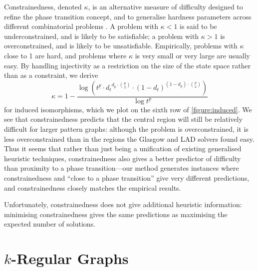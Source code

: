 \documentclass[twoside,11pt]{article}
\newcommand{\citep}[1]{\cite{#1}}
\begin{document}
Constrainedness, denoted $\kappa$, is an alternative measure of difficulty designed to refine the
phase transition concept, and to generalise hardness parameters across different combinatorial
problems \citep{DBLP:conf/aaai/GentMPW96}. A problem with $\kappa < 1$ is said to be
underconstrained, and is likely to be satisfiable; a problem with $\kappa > 1$ is overconstrained,
and is likely to be unsatisfiable. Empirically, problems with $\kappa$ close to 1 are hard, and
problems where $\kappa$ is very small or very large are usually easy. By handling injectivity as a
restriction on the size of the state space rather than as a constraint, we derive
\begin{equation}\label{equation:constrainedness}\kappa = 1 - \frac{\log \left( t^{\underline{p}}
\cdot {d_t}^{d_p \cdot \binom{p}{2}} \cdot {(1 - d_{t})}^{(1 - d_{p}) \cdot \binom{p}{2}}
\right)}{\log t^{\underline{p}}} \end{equation} for induced isomorphisms, which we plot on the sixth
row of \cref{figure:induced}. We see that constrainedness predicts that the central region will
still be relatively difficult for larger pattern graphs: although the problem is overconstrained, it
is less overconstrained than in the regions the Glasgow and LAD solvers found easy.  Thus it seems
that rather than just being a unification of existing generalised heuristic techniques,
constrainedness also gives a better predictor of difficulty than proximity to a phase
transition---our method generates instances where constrainedness and ``close to a phase
transition'' give very different predictions, and constrainedness closely matches the empirical
results.

Unfortunately, constrainedness does not give additional heuristic information: minimising
constrainedness gives the same predictions as maximising the expected number of solutions.

\section{$k$-Regular Graphs}\label{section:regular}
\end{document}

